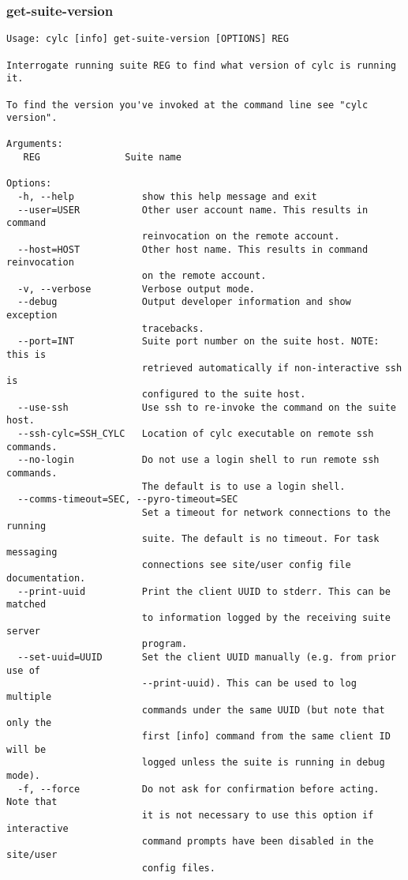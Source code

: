 \subsubsection{get-suite-version}
\label{get-suite-version}
\begin{lstlisting}
Usage: cylc [info] get-suite-version [OPTIONS] REG 

Interrogate running suite REG to find what version of cylc is running it.

To find the version you've invoked at the command line see "cylc version".

Arguments:
   REG               Suite name

Options:
  -h, --help            show this help message and exit
  --user=USER           Other user account name. This results in command
                        reinvocation on the remote account.
  --host=HOST           Other host name. This results in command reinvocation
                        on the remote account.
  -v, --verbose         Verbose output mode.
  --debug               Output developer information and show exception
                        tracebacks.
  --port=INT            Suite port number on the suite host. NOTE: this is
                        retrieved automatically if non-interactive ssh is
                        configured to the suite host.
  --use-ssh             Use ssh to re-invoke the command on the suite host.
  --ssh-cylc=SSH_CYLC   Location of cylc executable on remote ssh commands.
  --no-login            Do not use a login shell to run remote ssh commands.
                        The default is to use a login shell.
  --comms-timeout=SEC, --pyro-timeout=SEC
                        Set a timeout for network connections to the running
                        suite. The default is no timeout. For task messaging
                        connections see site/user config file documentation.
  --print-uuid          Print the client UUID to stderr. This can be matched
                        to information logged by the receiving suite server
                        program.
  --set-uuid=UUID       Set the client UUID manually (e.g. from prior use of
                        --print-uuid). This can be used to log multiple
                        commands under the same UUID (but note that only the
                        first [info] command from the same client ID will be
                        logged unless the suite is running in debug mode).
  -f, --force           Do not ask for confirmation before acting. Note that
                        it is not necessary to use this option if interactive
                        command prompts have been disabled in the site/user
                        config files.
\end{lstlisting}
